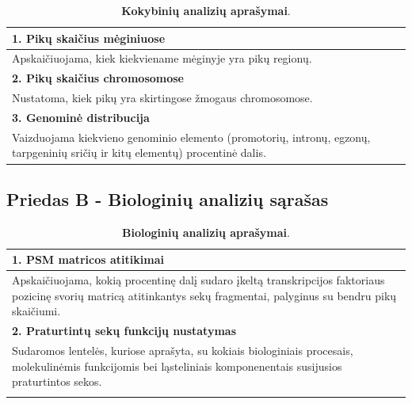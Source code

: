 \documentclass[12pt]{article}
\begin{document}
\begin{table}[htb!]
    \label{table:KOKYBINES_ANALIZES}
    \captionsetup{justification=centering}
    \caption{\small\textbf{Kokybinių analizių aprašymai}.}
    \vskip -10pt
    \begin{tabular}{|>{\raggedright\arraybackslash}m{16cm}|}
        \hline
        \textbf{\cellcolor{deepchampagne}1. Pikų skaičius mėginiuose} \\
        \hline
        Apskaičiuojama, kiek kiekviename mėginyje yra pikų regionų. \\
        \hline
        \textbf{\cellcolor{deepchampagne}2. Pikų skaičius chromosomose} \\
        \hline
        Nustatoma, kiek pikų yra skirtingose žmogaus chromosomose. \\
        \hline
        \textbf{\cellcolor{deepchampagne}3. Genominė distribucija} \\
        \hline
        Vaizduojama kiekvieno genominio elemento (promotorių, intronų, egzonų,
        tarpgeninių sričių ir kitų elementų) procentinė dalis. \\
        \hline
    \end{tabular}
\end{table}

\newpage

\subsection{Priedas B - Biologinių analizių sąrašas}

\begin{table}[htb!]
    \label{table:BIOLOGINES_ANALIZES}
    \captionsetup{justification=centering}
    \caption{\small\textbf{Biologinių analizių aprašymai}.}
    \vskip -10pt
    \begin{tabular}{|>{\raggedright\arraybackslash}m{16cm}|}
        \hline
        \textbf{\cellcolor{deepchampagne}1. PSM matricos atitikimai} \\
        \hline
        Apskaičiuojama, kokią procentinę dalį sudaro įkeltą transkripcijos
        faktoriaus pozicinę svorių matricą atitinkantys sekų fragmentai,
        palyginus su bendru pikų skaičiumi. \\
        \hline
        \textbf{\cellcolor{deepchampagne}2. Praturtintų sekų funkcijų
        nustatymas} \\
        \hline
        Sudaromos lentelės, kuriose aprašyta, su kokiais biologiniais procesais,
        molekulinėmis funkcijomis bei ląsteliniais komponenentais susijusios
        praturtintos sekos. \\
        \hline
        \textbf{\cellcolor{deepchampagne}\emph{\color{red}{3. Pildoma ligas
        identifikuojančiomis analizėmis...}}} \\
        \hline
    \end{tabular}
\end{table}

\newpage

\end{document}
